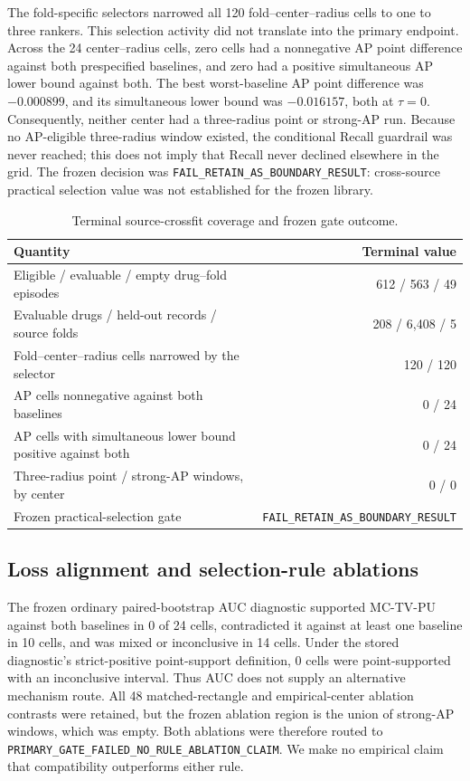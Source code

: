 \documentclass[preprint,review,12pt]{elsarticle}
\begin{document}
The fold-specific selectors narrowed all 120 fold--center--radius cells to one
to three rankers. This selection activity did not translate into the primary
endpoint. Across the 24 center--radius cells, zero cells had a nonnegative AP
point difference against both prespecified baselines, and zero had a positive
simultaneous AP lower bound against both. The best worst-baseline AP point
difference was \(-0.000899\), and its simultaneous lower bound was
\(-0.016157\), both at \(\tau=0\). Consequently, neither center had a
three-radius point or strong-AP run. Because no AP-eligible three-radius window
existed, the conditional Recall guardrail was never reached; this does not imply
that Recall never declined elsewhere in the grid. The frozen decision
was \texttt{FAIL\_RETAIN\_AS\_BOUNDARY\_RESULT}: cross-source practical
selection value was not established for the frozen library.

\begin{table}[t]
\centering
\caption{Terminal source-crossfit coverage and frozen gate outcome.}
\label{tab:crossfit-result}
\small
\begin{tabularx}{\linewidth}{Xr}
\toprule
Quantity & Terminal value \\
\midrule
Eligible / evaluable / empty drug--fold episodes & 612 / 563 / 49 \\
Evaluable drugs / held-out records / source folds & 208 / 6,408 / 5 \\
Fold--center--radius cells narrowed by the selector & 120 / 120 \\
AP cells nonnegative against both baselines & 0 / 24 \\
AP cells with simultaneous lower bound positive against both & 0 / 24 \\
Three-radius point / strong-AP windows, by center & 0 / 0 \\
Frozen practical-selection gate & \texttt{FAIL\_RETAIN\_AS\_BOUNDARY\_RESULT} \\
\bottomrule
\end{tabularx}
\end{table}

\subsection{Loss alignment and selection-rule ablations}

The frozen ordinary paired-bootstrap AUC diagnostic supported MC-TV-PU
against both baselines in 0 of 24 cells, contradicted it against at least one
baseline in 10 cells, and was mixed or inconclusive in 14 cells. Under the
stored diagnostic's strict-positive point-support definition, 0 cells were
point-supported with an inconclusive interval. Thus AUC does not supply an
alternative mechanism route. All 48 matched-rectangle and empirical-center
ablation contrasts were retained, but the frozen ablation region is the
union of strong-AP windows, which was empty. Both ablations were therefore
routed to \texttt{PRIMARY\_GATE\_FAILED\_NO\_RULE\_ABLATION\_CLAIM}. We make no
empirical claim that compatibility outperforms either rule.
\end{document}
